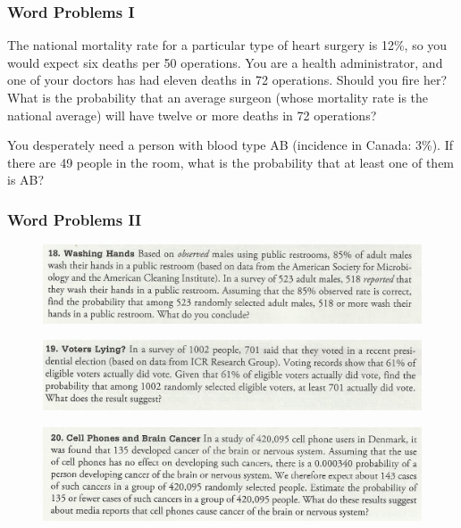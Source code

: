\documentclass[xcolor=dvipsnames]{beamer}
\begin{document}
\begin{frame}
  \frametitle{Word Problems I}
The national mortality rate for a particular type of heart surgery
is 12\%, so you would expect six deaths per 50 operations. You are a
health administrator, and one of your doctors has had eleven deaths in
72 operations. Should you fire her? What is the probability that an
average surgeon (whose mortality rate is the national average) will
have twelve or more deaths in 72 operations?

\bigskip

You desperately need a person with blood type AB (incidence in
Canada: 3\%). If there are 49 people in the room, what is the
probability that at least one of them is AB?
\end{frame}

\begin{frame}
  \frametitle{Word Problems II}
  \begin{figure}[h]
    \includegraphics[scale=.7]{./triola1.png}
  \end{figure}
  \begin{figure}[h]
    \includegraphics[scale=.7]{./triola2.png}
  \end{figure}
  \begin{figure}[h]
    \includegraphics[scale=.7]{./triola3.png}
  \end{figure}
\end{frame}
\end{document}
